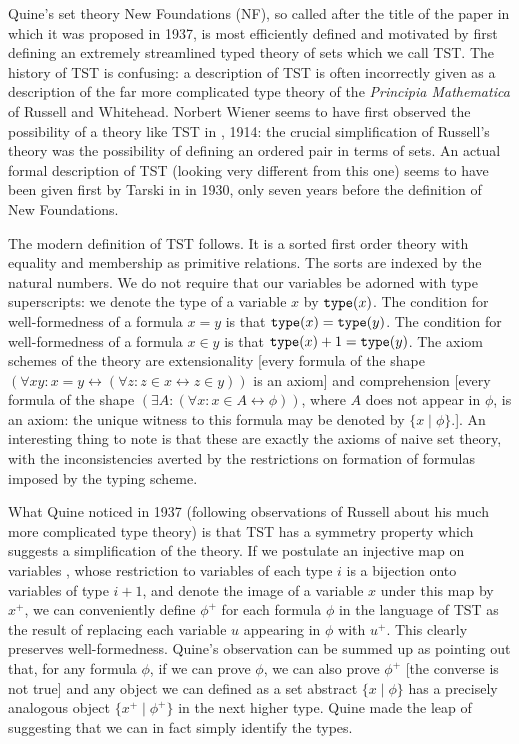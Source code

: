 \documentclass[12pt]{article}
\begin{document}
Quine's set theory New Foundations (NF), so called after the title of the paper \cite{nf} in which it was proposed in 1937, is most efficiently defined and motivated by first defining an extremely streamlined typed theory of sets which we call TST.  The history of TST is confusing:  a description of TST is often incorrectly given as a description of the far more complicated type theory of the {\em Principia Mathematica\/} of Russell and Whitehead.  Norbert Wiener seems to have first observed the possibility of a theory like TST in \cite{wienerpair}, 1914:  the crucial simplification of Russell's theory was the possibility of defining an ordered pair in terms of sets.  An actual formal description of TST (looking very different from this one) seems to have been given first by Tarski in \cite{tarskitst} in 1930, only seven years before the definition of New Foundations.

The modern definition of TST follows.  It is a sorted first order theory with equality and membership as primitive relations.  The sorts are indexed by the natural numbers.   We do not require that our variables be adorned with type superscripts:  we denote the type of a variable $x$ by ${\tt type}(x)$.  The condition for well-formedness of a formula $x=y$ is that ${\tt type}(x)={\tt type}(y)$.  The condition for well-formedness of a formula $x \in y$
is that ${\tt type}(x)+1={\tt type}(y)$.  The axiom schemes of the theory are extensionality [every formula of the shape $(\forall xy:x=y \leftrightarrow (\forall z:z \in x \leftrightarrow z \in y))$ is an axiom] and comprehension
[every formula of the shape $(\exists A:(\forall x:x \in A \leftrightarrow \phi))$, where $A$ does not appear in $\phi$, is an axiom:  the unique witness to this formula may be denoted by $\{x\mid \phi\}$.].  An interesting thing to note is that these are exactly the axioms of naive set theory, with the inconsistencies averted by the restrictions on formation of formulas imposed by the typing scheme.

What Quine noticed in 1937 (following observations of Russell about his much more complicated type theory) is that TST has a symmetry property which suggests a simplification of the theory.
If we postulate an injective map on variables , whose restriction to variables of each type $i$ is a bijection onto variables of type $i+1$, and denote the image of a variable $x$ under this map by $x^+$, we can conveniently define $\phi^+$ for each formula $\phi$ in the language of TST as the result of replacing each variable $u$ appearing in $\phi$ with $u^+$.  This clearly preserves well-formedness.  Quine's observation can be summed up as pointing out that, for any formula $\phi$, if we can prove $\phi$, we can also prove $\phi^+$ [the converse is not true] and any object we can defined as a set abstract $\{x\mid \phi\}$ has a precisely analogous object $\{x^+\mid \phi^+\}$ in the next higher type.  Quine made the leap of suggesting that we can in fact simply identify the types.
\end{document}
